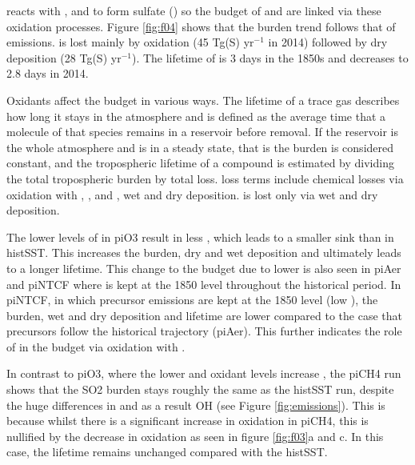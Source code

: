  reacts with ,  and  to form sulfate () so the budget of  and  are linked via these oxidation processes. Figure \ref{fig:f04} shows that the  burden trend follows that of  emissions.  is lost mainly by oxidation (45 Tg(S) yr$^{-1}$ in 2014) followed by dry deposition (28 Tg(S) yr$^{-1}$). The lifetime of  is 3 days in the 1850s and decreases to 2.8 days in 2014. 

Oxidants affect the  budget in various ways. The lifetime of a trace gas describes how long it stays in the atmosphere and is defined as the average time that a molecule of that species remains in a reservoir before removal. If the reservoir is the whole atmosphere and is in a steady state, that is the burden is considered constant, and the tropospheric lifetime of a compound is estimated by dividing the total tropospheric burden by total loss.  loss terms include chemical losses via oxidation with , , and , wet and dry deposition.  is lost only via wet and dry deposition.

The lower levels of  in piO3 result in less , which leads to a smaller  sink than in histSST. This increases the  burden, dry and wet deposition and ultimately leads to a longer lifetime. This change to the  budget due to lower  is also seen in piAer and piNTCF where  is kept at the 1850 level throughout the historical period. In piNTCF, in which  precursor emissions are kept at the 1850 level (low ), the  burden, wet and dry deposition and lifetime are lower compared to the case that  precursors follow the historical trajectory (piAer). This further indicates the role of  in the  budget via oxidation with .


In contrast to piO3, where the lower  and oxidant levels increase , the piCH4 run shows that the SO2 burden stays roughly the same as the histSST run, despite the huge differences in  and as a result OH (see Figure \ref{fig:emissions}). This is because whilst there is a significant increase in  oxidation in piCH4, this is nullified by the decrease in  oxidation as seen in figure \ref{fig:f03}a and c. In this case, the  lifetime remains unchanged compared with the histSST.

